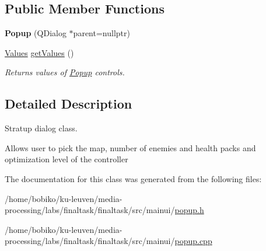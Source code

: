 \subsection*{Public Member Functions}
\begin{DoxyCompactItemize}
\item 
{\bfseries Popup} (Q\+Dialog $\ast$parent=nullptr)\hypertarget{classPopup_ae485ca6139d79feabf12322369e7ecbc}{}\label{classPopup_ae485ca6139d79feabf12322369e7ecbc}

\item 
\hyperlink{structValues}{Values} \hyperlink{classPopup_a7db1e47b567d26051a5dd40d1c14dd89}{get\+Values} ()\hypertarget{classPopup_a7db1e47b567d26051a5dd40d1c14dd89}{}\label{classPopup_a7db1e47b567d26051a5dd40d1c14dd89}

\begin{DoxyCompactList}\small\item\em Returns values of \hyperlink{classPopup}{Popup} controls. \end{DoxyCompactList}\end{DoxyCompactItemize}


\subsection{Detailed Description}
Stratup dialog class. 

Allows user to pick the map, number of enemies and health packs and optimization level of the controller 

The documentation for this class was generated from the following files\+:\begin{DoxyCompactItemize}
\item 
/home/bobiko/ku-\/leuven/media-\/processing/labs/finaltask/finaltask/src/mainui/\hyperlink{popup_8h}{popup.\+h}\item 
/home/bobiko/ku-\/leuven/media-\/processing/labs/finaltask/finaltask/src/mainui/\hyperlink{popup_8cpp}{popup.\+cpp}\end{DoxyCompactItemize}
